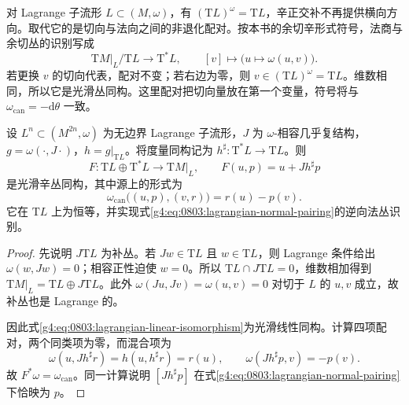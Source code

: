 对 Lagrange 子流形 \(L\subset(M,\omega)\)，有 \((\mathrm{T}L)^\omega=\mathrm{T}L\)，辛正交补不再提供横向方向。取代它的是切向与法向之间的非退化配对。按本书的余切辛形式符号，法商与余切丛的识别写成
\begin{equation}\label{g4:eq:0803:lagrangian-normal-pairing}
	\mathrm{T}M|_L/\mathrm{T}L\longrightarrow\mathrm{T}^*L,
	\qquad [v]\longmapsto\bigl(u\mapsto\omega(u,v)\bigr).
\end{equation}
若更换 \(v\) 的切向代表，配对不变；若右边为零，则 \(v\in(\mathrm{T}L)^\omega=\mathrm{T}L\)。维数相同，所以它是光滑丛同构。这里配对把切向量放在第一个变量，符号将与 \(\omega_{\mathrm{can}}=-\mathrm{d}\theta\) 一致。

\begin{lemma}\label{g4:lem:0803:lagrangian-linear-model}
	设 \(L^n\subset(M^{2n},\omega)\) 为无边界 Lagrange 子流形，\(J\) 为 \(\omega\)-相容几乎复结构，\(g=\omega(\cdot,J\cdot)\)，\(h=g|_{\mathrm{T}L}\)。将度量同构记为 \(h^\sharp:\mathrm{T}^*L\to\mathrm{T}L\)。则
	\begin{equation}\label{g4:eq:0803:lagrangian-linear-isomorphism}
		F:\mathrm{T}L\oplus\mathrm{T}^*L\longrightarrow\mathrm{T}M|_L,
		\qquad F(u,p)=u+Jh^\sharp p
	\end{equation}
	是光滑辛丛同构，其中源上的形式为
	\[
		\omega_{\mathrm{can}}\bigl((u,p),(v,r)\bigr)=r(u)-p(v).
	\]
	它在 \(\mathrm{T}L\) 上为恒等，并实现式\eqref{g4:eq:0803:lagrangian-normal-pairing}的逆向法丛识别。
\end{lemma}
\begin{proof}
	先说明 \(J\mathrm{T}L\) 为补丛。若 \(Jw\in\mathrm{T}L\) 且 \(w\in\mathrm{T}L\)，则 Lagrange 条件给出 \(\omega(w,Jw)=0\)；相容正性迫使 \(w=0\)。所以 \(\mathrm{T}L\cap J\mathrm{T}L=0\)，维数相加得到 \(\mathrm{T}M|_L=\mathrm{T}L\oplus J\mathrm{T}L\)。此外 \(\omega(Ju,Jv)=\omega(u,v)=0\) 对切于 \(L\) 的 \(u,v\) 成立，故补丛也是 Lagrange 的。

	因此式\eqref{g4:eq:0803:lagrangian-linear-isomorphism}为光滑线性同构。计算四项配对，两个同类项为零，而混合项为
	\[
		\omega(u,Jh^\sharp r)=h(u,h^\sharp r)=r(u),\qquad
		\omega(Jh^\sharp p,v)=-p(v).
	\]
	故 \(F^*\omega=\omega_{\mathrm{can}}\)。同一计算说明 \([Jh^\sharp p]\) 在式\eqref{g4:eq:0803:lagrangian-normal-pairing}下恰映为 \(p\)。
\end{proof}

